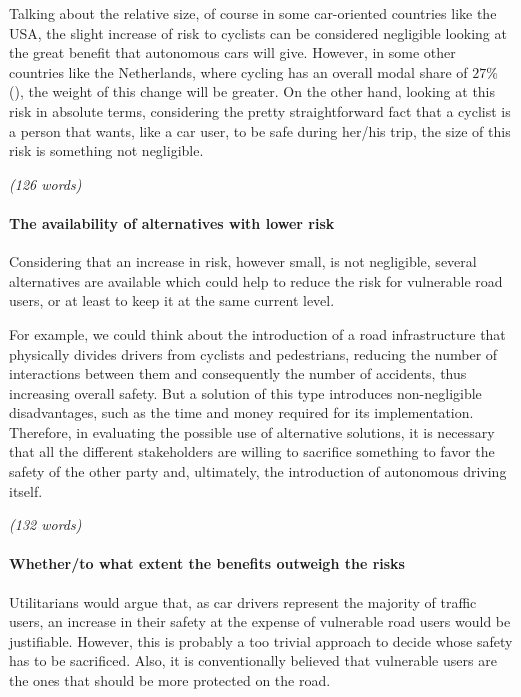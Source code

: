 Talking about the relative size, of course in some car-oriented countries like the USA, the slight increase of risk to cyclists can be considered negligible looking at the great benefit that autonomous cars will give. However, in some other countries like the Netherlands, where cycling has an overall modal share of $27\%$ (\cite{enwiki:1057840626}), the weight of this change will be greater.
On the other hand, looking at this risk in absolute terms, considering the pretty straightforward fact that a cyclist is a person that wants, like a car user, to be safe during her/his trip, the size of this risk is something not negligible.

\emph{(126 words)}

\paragraph{The availability of alternatives with lower risk}
Considering that an increase in risk, however small, is not negligible, several alternatives are available which could help to reduce the risk for vulnerable road users, or at least to keep it at the same current level.

For example, we could think about the introduction of a road infrastructure that physically divides drivers from cyclists and pedestrians, reducing the number of interactions between them and consequently the number of accidents, thus increasing overall safety. But a solution of this type introduces non-negligible disadvantages, such as the time and money required for its implementation. Therefore, in evaluating the possible use of alternative solutions, it is necessary that all the different stakeholders are willing to sacrifice something to favor the safety of the other party and, ultimately, the introduction of autonomous driving itself.

\emph{(132 words)}

\paragraph{Whether/to what extent the benefits outweigh the risks}
Utilitarians would argue that, as car drivers represent the majority of traffic users, an increase in their safety at the expense of vulnerable road users would be justifiable. However, this is probably a too trivial approach to decide whose safety has to be sacrificed. Also, it is conventionally believed that vulnerable users are the ones that should be more protected on the road.


